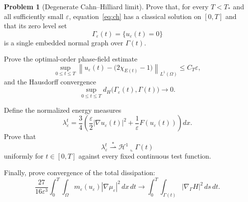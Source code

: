 \documentclass[10pt,a4paper]{article}
\theoremstyle{definition}
\newtheorem*{problem*}{Problem}
\begin{document}
\begin{problem*}[Degenerate Cahn--Hilliard limit]
Prove that, for every $T<T_*$ and all sufficiently small $\varepsilon$,
equation~\eqref{eq:ch} has a classical solution on $[0,T]$ and that its zero
level set
\begin{equation}
  \Gamma_\varepsilon(t)
  =
  \{u_\varepsilon(t)=0\}
\end{equation}
is a single embedded normal graph over $\Gamma(t)$.

Prove the optimal-order phase-field estimate
\begin{equation}
  \sup_{0\leq t\leq T}
  \left\|
    u_\varepsilon(t)
    -
    \bigl(2\chi_{E(t)}-1\bigr)
  \right\|_{L^1(\Omega)}
  \leq C_T\varepsilon,
\end{equation}
and the Hausdorff convergence
\begin{equation}
  \sup_{0\leq t\leq T}
  d_H\bigl(\Gamma_\varepsilon(t),\Gamma(t)\bigr)
  \longrightarrow 0.
\end{equation}

Define the normalized energy measures
\begin{equation}
  \lambda_\varepsilon^t
  =
  \frac{3}{4}
  \left(
    \frac{\varepsilon}{2}|\nabla u_\varepsilon(t)|^2
    +
    \frac{1}{\varepsilon}F(u_\varepsilon(t))
  \right)dx.
\end{equation}
Prove that
\begin{equation}
  \lambda_\varepsilon^t
  \stackrel{*}{\rightharpoonup}
  \mathcal H^1\!\llcorner\Gamma(t)
\end{equation}
uniformly for $t\in[0,T]$ against every fixed continuous test function.

Finally, prove convergence of the total dissipation:
\begin{equation}
  \frac{27}{16\varepsilon^3}
  \int_0^T\int_\Omega
  m_\varepsilon(u_\varepsilon)|\nabla\mu_\varepsilon|^2\,dx\,dt
  \longrightarrow
  \int_0^T\int_{\Gamma(t)}
  |\nabla_\Gamma H|^2\,ds\,dt.
\end{equation}
\end{problem*}
\end{document}
